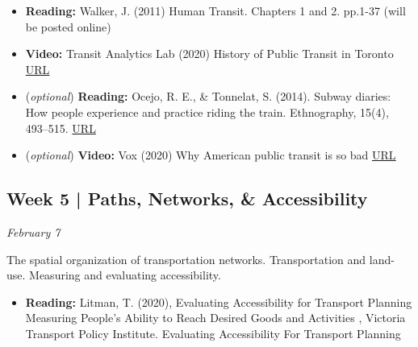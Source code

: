 \documentclass[11pt]{article}
\begin{document}
	\begin{itemize}
		\item \textbf{Reading:} Walker, J. (2011) Human Transit. Chapters 1 and 2. pp.1-37 (will be posted online)
		
		\item \textbf{Video:} Transit Analytics Lab (2020) History of Public Transit in Toronto \href{https://www.youtube.com/watch?v=0Rd4RzsRsWg}{URL}
		
		
		
		\item (\textit{optional}) \textbf{Reading:} Ocejo, R. E., \& Tonnelat, S. (2014). Subway diaries: How people experience and practice
		riding the train. Ethnography, 15(4), 493–515.
		\href{https://doi.org/10.1177/1466138113491171}{URL}
		
		\item (\textit{optional}) \textbf{Video:} Vox (2020) Why American public transit is so bad \href{https://www.youtube.com/watch?v=-ZDZtBRTyeI}{URL}
		
	\end{itemize}
	
	
	
	
	
	
	
	
	
	
	\subsection*{Week 5 | Paths, Networks, \& Accessibility}
	
	\textit{February 7}
	
	The spatial organization of transportation networks. Transportation and land-use. Measuring and evaluating accessibility.
	
	\begin{itemize}
		\item \textbf{Reading:} Litman, T. (2020), Evaluating Accessibility for Transport Planning Measuring People’s Ability to
		Reach Desired Goods and Activities , Victoria Transport Policy Institute. Evaluating Accessibility
		For Transport Planning
		
		
	\end{itemize}
	
	
	
	
\end{document}
